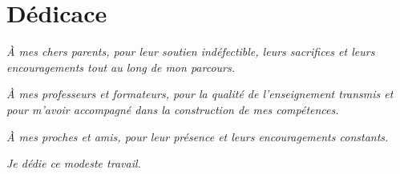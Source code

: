 \chapter*{Dédicace}

\begin{center}
\textit{À mes chers parents, pour leur soutien indéfectible, leurs sacrifices et leurs
encouragements tout au long de mon parcours.}

\vspace{0.6cm}

\textit{À mes professeurs et formateurs, pour la qualité de l'enseignement transmis et
pour m'avoir accompagné dans la construction de mes compétences.}

\vspace{0.6cm}

\textit{À mes proches et amis, pour leur présence et leurs encouragements constants.}

\vspace{0.6cm}

\textit{Je dédie ce modeste travail.}
\end{center}
